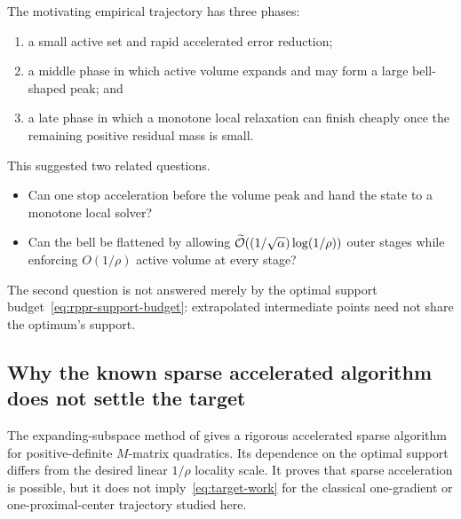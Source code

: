 The motivating empirical trajectory has three phases:
\begin{enumerate}[label=(\roman*),leftmargin=*]
  \item a small active set and rapid accelerated error reduction;
  \item a middle phase in which active volume expands and may form a large
  bell-shaped peak; and
  \item a late phase in which a monotone local relaxation can finish cheaply
  once the remaining positive residual mass is small.
\end{enumerate}
This suggested two related questions.
\begin{itemize}[leftmargin=*]
  \item Can one stop acceleration before the volume peak and hand the state to
  a monotone local solver?
  \item Can the bell be flattened by allowing
  $\widetilde{\mathcal{O}}((1/\sqrt\alpha)\log(1/\rho))$ outer stages while enforcing
  $O(1/\rho)$ active volume at every stage?
\end{itemize}
The second question is not answered merely by the optimal support
budget~\eqref{eq:rppr-support-budget}: extrapolated intermediate points need
not share the optimum's support.

\subsection{Why the known sparse accelerated algorithm does not settle the target}

The expanding-subspace method of \citet{martinezrubio2023accelerated} gives a
rigorous accelerated sparse algorithm for positive-definite $M$-matrix
quadratics.  Its dependence on the optimal support differs from the desired
linear $1/\rho$ locality scale.  It proves that sparse acceleration is
possible, but it does not imply~\eqref{eq:target-work} for the classical
one-gradient or one-proximal-center trajectory studied here.
